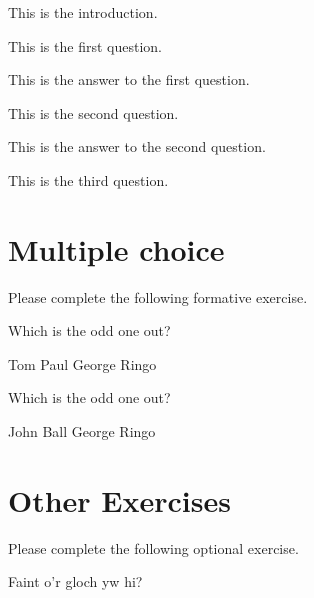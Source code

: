 \documentclass{camel}
\begin{document}
\begin{diagnostic}\label{diag:demo}
This is the introduction.
\begin{questions} 
\question This is the first question.\label{qu:first-question}
\begin{answer} 
This is the answer to the first question.
\end{answer} 
\question This is the second question.\label{qu:second-question}
\begin{answer} 
This is the answer to the second question.
\end{answer} 
\question This is the third question.\label{qu:third-question}
\end{questions} 
\end{diagnostic}

\section{Multiple choice}

\begin{formative}\label{di:beatles} 
Please complete the following formative exercise.
\begin{questions} 
\question Which is the odd one out?  
\begin{choices} 
\correctchoice Tom
\choice Paul 
\choice George 
\choice Ringo 
\end{choices} 
\question Which is the odd one out?  
\begin{choices} 
\choice John 
\correctchoice Ball 
\choice George 
\choice Ringo 
\end{choices} 
\end{questions}
\end{formative}

\section{Other Exercises}

\begin{exercise}
Please complete the following optional exercise.
\begin{questions} 
\question Faint o'r gloch yw hi?
\end{questions}
\end{exercise}
\end{document}
